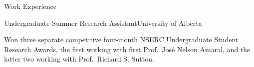 \documentclass[a4paper,dateabbrev]{cv}
\begin{document}
\begin{rSection}{Work Experience}
\begin{rSubsection}{Undergraduate Summer Research Assistant}{}{University of Alberta}
    \item Won three separate competitive four-month NSERC Undergraduate Student Research Awards, the first working with first Prof.\ Jos{\'{e}} Nelson Amaral, and the latter two working with Prof.\ Richard S. Sutton.
\end{rSubsection}

\end{rSection}

\end{document}
